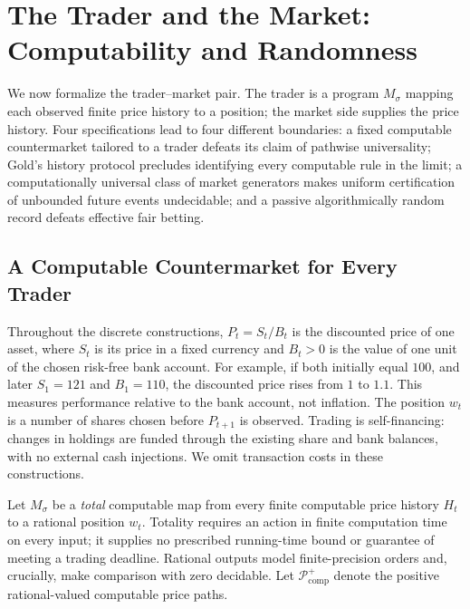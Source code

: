 \documentclass[aps,pra,reprint,superscriptaddress,amsmath,amssymb,floatfix]{revtex4-2}
\theoremstyle{plain}
\theoremstyle{definition}
\theoremstyle{remark}
\begin{document}
\section{The Trader and the Market: Computability and Randomness}
\label{sec:computability}

We now formalize the trader--market pair. The trader is a program
\(M_\sigma\) mapping each observed finite price history to a position; the
market side supplies the price history. Four specifications lead to four
different boundaries: a fixed computable countermarket tailored to a trader
defeats its claim of pathwise universality; Gold's history protocol precludes
identifying every computable rule in the limit; a computationally universal
class of market generators makes uniform certification of unbounded future
events undecidable; and a passive algorithmically random record defeats
effective fair betting.

\subsection{A Computable Countermarket for Every Trader}

Throughout the discrete constructions, \(P_t=S_t/B_t\) is the discounted
price of one asset, where \(S_t\) is its price in a fixed currency and
\(B_t>0\) is the value of one unit of the chosen risk-free bank account.
For example, if both initially equal \(100\), and later \(S_1=121\) and
\(B_1=110\), the discounted price rises from \(1\) to \(1.1\).
This measures performance relative to the bank account, not inflation.
The position \(w_t\) is a number of shares chosen before \(P_{t+1}\) is
observed. Trading is self-financing: changes in holdings are funded through
the existing share and bank balances, with no external cash injections.
We omit transaction costs in these constructions.

Let \(M_\sigma\) be a \emph{total} computable map from every finite computable
price history \(H_t\) to a rational position \(w_t\). Totality requires an
action in finite computation time on every input; it supplies no prescribed
running-time bound or guarantee of meeting a trading deadline. Rational outputs
model finite-precision orders and, crucially, make comparison with zero
decidable. Let \(\mathcal P_{\mathrm{comp}}^{+}\) denote the positive
rational-valued computable price paths.
\end{document}
